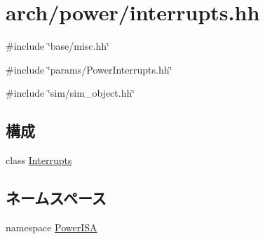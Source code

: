 \hypertarget{power_2interrupts_8hh}{
\section{arch/power/interrupts.hh}
\label{power_2interrupts_8hh}
}
{\ttfamily \#include \char`\"{}base/misc.hh\char`\"{}}\par
{\ttfamily \#include \char`\"{}params/PowerInterrupts.hh\char`\"{}}\par
{\ttfamily \#include \char`\"{}sim/sim\_\-object.hh\char`\"{}}\par
\subsection*{構成}
\begin{DoxyCompactItemize}
\item 
class \hyperlink{classPowerISA_1_1Interrupts}{Interrupts}
\end{DoxyCompactItemize}
\subsection*{ネームスペース}
\begin{DoxyCompactItemize}
\item 
namespace \hyperlink{namespacePowerISA}{PowerISA}
\end{DoxyCompactItemize}

